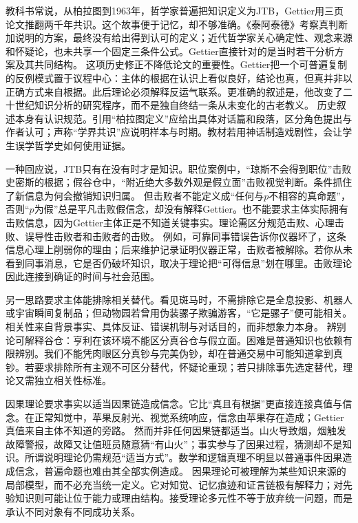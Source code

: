 教科书常说，从柏拉图到1963年，哲学家普遍把知识定义为JTB，Gettier用三页论文推翻两千年共识。这个故事便于记忆，却不够准确。《泰阿泰德》考察真判断加说明的方案，最终没有给出得到认可的定义\parencite[201c--210b]{plato1990}；近代哲学家关心确定性、观念来源和怀疑论，也未共享一个固定三条件公式。Gettier直接针对的是当时若干分析方案及其共同结构\parencite{gettier1963}。 这项历史修正不降低论文的重要性。Gettier把一个可普遍复制的反例模式置于议程中心：主体的根据在认识上看似良好，结论也真，但真并非以正确方式来自根据。此后理论必须解释反运气联系。更准确的叙述是，他改变了二十世纪知识分析的研究程序，而不是独自终结一条从未变化的古老教义。 历史叙述本身有认识规范。引用“柏拉图定义”应给出具体对话篇和段落，区分角色提出与作者认可；声称“学界共识”应说明样本与时期。教材若用神话制造戏剧性，会让学生误学哲学史如何使用证据。

一种回应说，JTB只有在没有时才是知识。职位案例中，“琼斯不会得到职位”击败史密斯的根据；假谷仓中，“附近绝大多数外观是假立面”击败视觉判断。条件抓住了新信息为何会撤销知识归属。 但击败者不能定义成“任何与$p$不相容的真命题”，否则“$p$为假”总是平凡击败假信念，却没有解释Gettier。也不能要求主体实际拥有击败信息，因为Gettier主体正是不知道关键事实。理论需区分规范击败、心理击败、误导性击败者和击败者的击败。 例如，可靠同事错误告诉你仪器坏了，这条信息心理上削弱你的理由；后来维护记录证明仪器正常，击败者被解除。若你从未看到同事消息，它是否仍破坏知识，取决于理论把“可得信息”划在哪里。击败理论因此连接到确证的时间与社会范围。

另一思路要求主体能排除相关替代。看见斑马时，不需排除它是全息投影、机器人或宇宙瞬间复制品；但动物园若曾用伪装骡子欺骗游客，“它是骡子”便可能相关。相关性来自背景事实、具体反证、错误机制与对话目的，而非想象力本身。 辨别论可解释谷仓：亨利在该环境不能区分真谷仓与假立面。困难是普通知识也依赖有限辨别。我们不能凭肉眼区分真钞与完美伪钞，却在普通交易中可能知道拿到真钞。若要求排除所有主观不可区分替代，怀疑论重现；若只排除事先选定替代，理论又需独立相关性标准。

因果理论要求事实以适当因果链造成信念\parencite{goldman1967}。它比“真且有根据”更直接连接真值与信念。在正常知觉中，苹果反射光、视觉系统响应，信念由苹果存在造成；Gettier真值来自主体不知道的旁路。 然而并非任何因果链都适当。山火导致烟，烟触发故障警报，故障又让值班员随意猜“有山火”；事实参与了因果过程，猜测却不是知识。所谓说明理论仍需规范“适当方式”。数学和逻辑真理不明显以普通事件因果造成信念，普遍命题也难由其全部实例造成。 因果理论可被理解为某些知识来源的局部模型，而不必充当统一定义。它对知觉、记忆痕迹和证言链极有解释力；对先验知识则可能让位于能力或理由结构。接受理论多元性不等于放弃统一问题，而是承认不同对象有不同成功关系。


